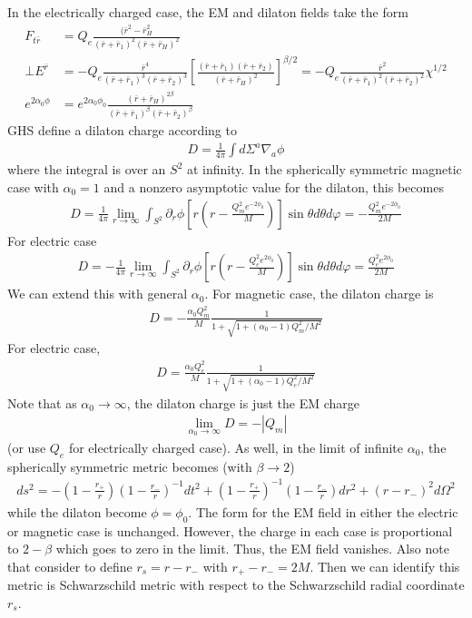 \documentclass[prd]{revtex4}
\begin{document}
In the electrically charged case, the EM and dilaton fields take the form
\begin{align}
F_{t \bar{r}} &= Q_e \frac{(\bar{r}^2 - \bar{r}_H^2}{(\bar{r}+\bar{r}_1)^2 (\bar{r}+\bar{r}_H)^2} \\
\bot E^{\bar{r}} &= -Q_e \frac{\bar{r}^4}{(\bar{r} + \bar{r}_1)^3 (\bar{r}+\bar{r}_2)^3} \left[\frac{(\bar{r}+\bar{r}_1)(\bar{r}+\bar{r}_2)}{(\bar{r}+\bar{r}_H)^2} \right]^{\beta/2} = -Q_e \frac{\bar{r}^2}{(\bar{r}+\bar{r}_1)^2(\bar{r}+\bar{r}_2)^2} \chi^{1/2} \\
e^{2 \alpha_0 \phi} &= e^{2 \alpha_0 \phi_0} \frac{(\bar{r}+\bar{r}_H)^{2 \beta}}{(\bar{r}+\bar{r}_1)^\beta (\bar{r} + \bar{r}_2)^\beta}
\end{align}
GHS define a dilaton charge according to
\begin{align}
D = \frac{1}{4\pi} \int d\Sigma^a \nabla_a \phi
\end{align}
where the integral is over an $S^2$ at infinity. In the spherically symmetric magnetic case with $\alpha_0=1$ and a nonzero asymptotic value for the dilaton, this becomes
\begin{align}
D = \frac{1}{4\pi} \lim_{r \to \infty} \int_{S^2} \partial_r \phi \left[ r \left(r-\frac{Q_m^2 e^{-2\phi_0}}{M} \right) \right] \sin \theta d \theta d \varphi = -\frac{Q_m^2 e^{-2 \phi_0}}{2M}
\end{align}
For electric case
\begin{align}
D = - \frac{1}{4\pi} \lim_{r \to \infty} \int_{S^2} \partial_r \phi \left[ r \left(r-\frac{Q_e^2 e^{2\phi_0}}{M} \right) \right] \sin \theta d \theta d \varphi = \frac{Q_e^2 e^{2 \phi_0}}{2M}
\end{align}
We can extend this with general $\alpha_0$. For magnetic case, the dilaton charge is
\begin{align}
D = -\frac{\alpha_0 Q_m^2}{M} \frac{1}{1+\sqrt{1+(\alpha_0-1)Q^2_m/M^2}}
\end{align}
For electric case,
\begin{align}
D = \frac{\alpha_0 Q_e^2}{M} \frac{1}{1+\sqrt{1+(\alpha_0-1)Q^2_e/M^2}}
\end{align}
Note that as $\alpha_0 \rightarrow \infty$, the dilaton charge is just the EM charge
\begin{align}
\lim_{\alpha_0 \to \infty} D = - | Q_m |
\end{align}
(or use $Q_e$ for electrically charged case). As well, in the limit of infinite $\alpha_0$, the spherically symmetric metric becomes (with $\beta \rightarrow 2$)
\begin{align}
ds^2 = - \left( 1 - \frac{r_+}{r} \right) \left(1 - \frac{r_-}{r} \right)^{-1} dt^2 + \left( 1 - \frac{r_+}{r} \right)^{-1} \left(1 - \frac{r_-}{r} \right) dr^2 + (r-r_-)^2 d\Omega^2
\end{align}
while the dilaton become $\phi = \phi_0$. The form for the EM field in either the electric or magnetic case is unchanged. However, the charge in each case is proportional to $2-\beta$ which goes to zero in the limit. Thus, the EM field vanishes. Also note that consider to define $r_s = r - r_-$ with $r_+ - r_- = 2M$. Then we can identify this metric is Schwarzschild metric with respect to the Schwarzschild radial coordinate $r_s$.
\end{document}
